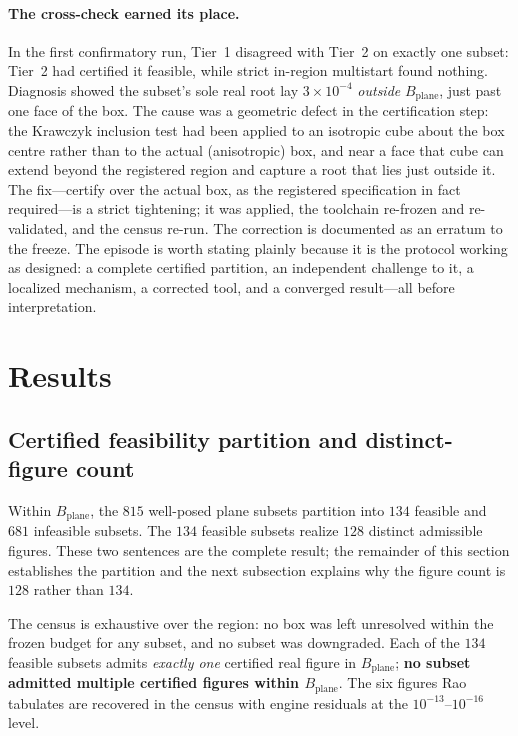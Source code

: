 \documentclass[11pt]{article}
\newcommand{\Bplane}{B_{\mathrm{plane}}}
\begin{document}
\paragraph{The cross-check earned its place.}
In the first confirmatory run, Tier~1 disagreed with Tier~2 on exactly one subset: Tier~2 had certified it feasible, while strict in-region multistart found nothing. Diagnosis showed the subset's sole real root lay $3\times10^{-4}$ \emph{outside} $\Bplane$, just past one face of the box. The cause was a geometric defect in the certification step: the Krawczyk inclusion test had been applied to an isotropic cube about the box centre rather than to the actual (anisotropic) box, and near a face that cube can extend beyond the registered region and capture a root that lies just outside it. The fix---certify over the actual box, as the registered specification in fact required---is a strict tightening; it was applied, the toolchain re-frozen and re-validated, and the census re-run. The correction is documented as an erratum to the freeze. The episode is worth stating plainly because it is the protocol working as designed: a complete certified partition, an independent challenge to it, a localized mechanism, a corrected tool, and a converged result---all before interpretation.

\section{Results}

\subsection{Certified feasibility partition and distinct-figure count}
\label{sec:partition}

Within $\Bplane$, the $815$ well-posed plane subsets partition into $134$ feasible and $681$ infeasible subsets. The $134$ feasible subsets realize $128$ distinct admissible figures. These two sentences are the complete result; the remainder of this section establishes the partition and the next subsection explains why the figure count is $128$ rather than $134$.

The census is exhaustive over the region: no box was left unresolved within the frozen budget for any subset, and no subset was downgraded. Each of the $134$ feasible subsets admits \emph{exactly one} certified real figure in $\Bplane$; \textbf{no subset admitted multiple certified figures within $\Bplane$}. The six figures Rao tabulates are recovered in the census with engine residuals at the $10^{-13}$--$10^{-16}$ level.
\end{document}
